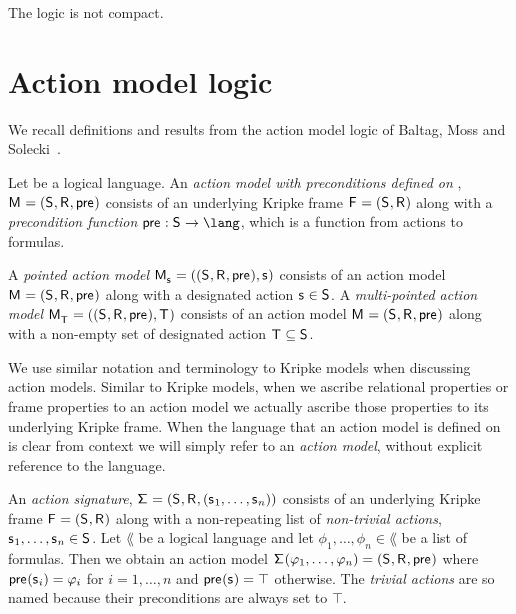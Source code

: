 \begin{proposition}
The logic \logicApalS{} is not compact.
\end{proposition}

\section{Action model logic}\label{aml}

We recall definitions and results from the action model logic of Baltag, Moss and Solecki~\cite{baltag:1998,baltag:2004}.

\begin{definition}
Let \lang{} be a logical language.
An {\em action model with preconditions defined on \lang{}}, $\aModelAndTuple$ consists of an underlying Kripke frame $\aFrameAndTuple$ along with a {\em precondition function} $\aPrecondition : \aStates \to \lang$, which is a function from actions to formulas.

A {\em pointed action model} $\aPModelAndTuple{\aStateS}$ consists of an action model $\aModelAndTuple$ along with a designated action $\aStateS \in \aStates$.
A {\em multi-pointed action model} $\aPModelAndTuple{\aStatesT}$ consists of an action model $\aModelAndTuple$ along with a non-empty set of designated action $\aStatesT \subseteq \aStates$.
\end{definition}

We use similar notation and terminology to Kripke models when discussing action models.
Similar to Kripke models, when we ascribe relational properties or frame properties to an action model we actually ascribe those properties to its underlying Kripke frame.
When the language that an action model is defined on is clear from context we will simply refer to an {\em action model}, without explicit reference to the language.

\begin{definition}
An {\em action signature}, $\aSignatureAndTuple$ consists of an underlying Kripke frame $\aFrameAndTuple$ along with a non-repeating list of {\em non-trivial actions}, $\aStateS_1, \dots, \aStateS_n \in \aStates$.
Let $\lang$ be a logical language and let $\phi_1, \dots, \phi_n \in \lang$ be a list of formulas.
Then we obtain an action model $\aSignature(\phi_1, \dots, \phi_n) = \aModelTuple$ where $\aPrecondition(\aStateS_i) = \phi_i$ for $i = 1, \dots, n$ and $\aPrecondition(\aStateS) = \top$ otherwise.
The {\em trivial actions} are so named because their preconditions are always set to $\top$.
\end{definition}

